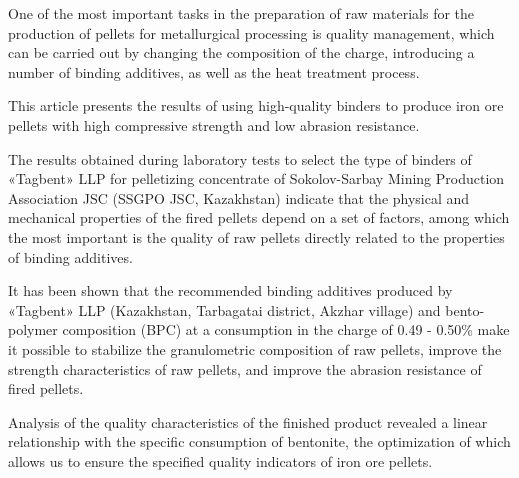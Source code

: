 One of the most important tasks in the preparation of raw materials for
the production of pellets for metallurgical processing is quality
management, which can be carried out by changing the composition of the
charge, introducing a number of binding additives, as well as the heat
treatment process.

This article presents the results of using high-quality binders to
produce iron ore pellets with high compressive strength and low abrasion
resistance.

The results obtained during laboratory tests to select the type of
binders of «Tagbent» LLP for pelletizing concentrate of Sokolov-Sarbay
Mining Production Association JSC (SSGPO JSC, Kazakhstan) indicate that
the physical and mechanical properties of the fired pellets depend on a
set of factors, among which the most important is the quality of raw
pellets directly related to the properties of binding additives.

It has been shown that the recommended binding additives produced by
«Tagbent» LLP (Kazakhstan, Tarbagatai district, Akzhar village) and
bento-polymer composition (BPC) at a consumption in the charge of 0.49 -
0.50\% make it possible to stabilize the granulometric composition of
raw pellets, improve the strength characteristics of raw pellets, and
improve the abrasion resistance of fired pellets.

Analysis of the quality characteristics of the finished product revealed
a linear relationship with the specific consumption of bentonite, the
optimization of which allows us to ensure the specified quality
indicators of iron ore pellets.

